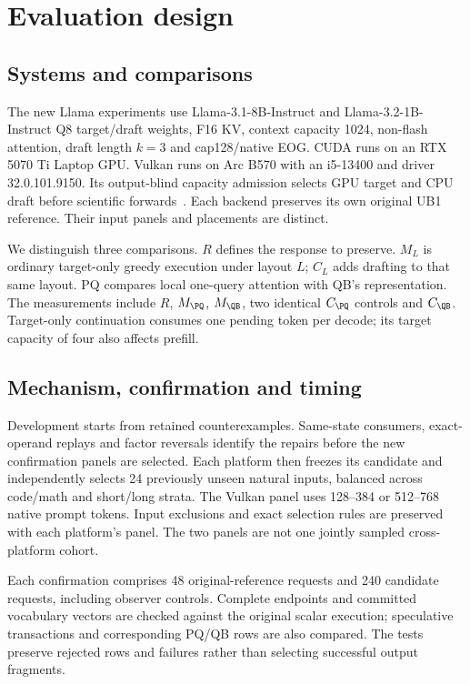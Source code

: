 \section{Evaluation design}
\label{sec:evaluation}
\subsection{Systems and comparisons}
The new Llama experiments use Llama-3.1-8B-Instruct and Llama-3.2-1B-Instruct Q8 target/draft weights, F16 KV, context capacity 1024, non-flash attention, draft length $k=3$ and cap128/native EOG. CUDA runs on an RTX 5070 Ti Laptop GPU. Vulkan runs on Arc B570 with an i5-13400 and driver 32.0.101.9150. Its output-blind capacity admission selects GPU target and CPU draft before scientific forwards~\cite{rtxllamarepair,b570llamarepair}. Each backend preserves its own original UB1 reference. Their input panels and placements are distinct.

We distinguish three comparisons. $R$ defines the response to preserve. $M_L$ is ordinary target-only greedy execution under layout $L$; $C_L$ adds drafting to that same layout. PQ compares local one-query attention with QB's representation. The measurements include $R$, $M_{\PQ}$, $M_{\QB}$, two identical $C_{\PQ}$ controls and $C_{\QB}$. Target-only continuation consumes one pending token per decode; its target capacity of four also affects prefill.

\subsection{Mechanism, confirmation and timing}
Development starts from retained counterexamples. Same-state consumers, exact-operand replays and factor reversals identify the repairs before the new confirmation panels are selected. Each platform then freezes its candidate and independently selects 24 previously unseen natural inputs, balanced across code/math and short/long strata. The Vulkan panel uses 128--384 or 512--768 native prompt tokens. Input exclusions and exact selection rules are preserved with each platform's panel. The two panels are not one jointly sampled cross-platform cohort.

Each confirmation comprises 48 original-reference requests and 240 candidate requests, including observer controls. Complete endpoints and committed vocabulary vectors are checked against the original scalar execution; speculative transactions and corresponding PQ/QB rows are also compared. The tests preserve rejected rows and failures rather than selecting successful output fragments.

